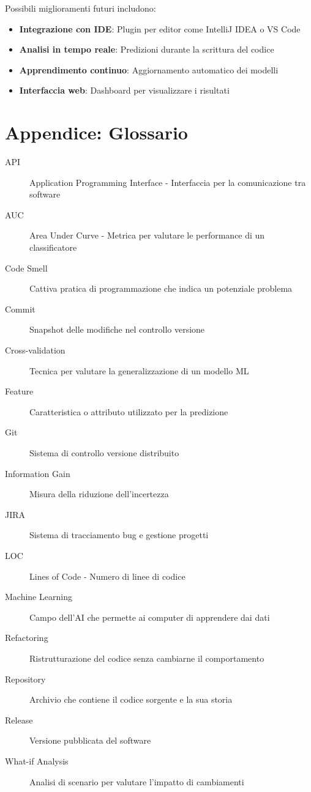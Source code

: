 \documentclass[12pt,a4paper]{article}
\begin{document}
Possibili miglioramenti futuri includono:
\begin{itemize}
    \item \textbf{Integrazione con IDE}: Plugin per editor come IntelliJ IDEA o VS Code
    \item \textbf{Analisi in tempo reale}: Predizioni durante la scrittura del codice
    \item \textbf{Apprendimento continuo}: Aggiornamento automatico dei modelli
    \item \textbf{Interfaccia web}: Dashboard per visualizzare i risultati
\end{itemize}

\section{Appendice: Glossario}

\begin{description}
    \item[API] Application Programming Interface - Interfaccia per la comunicazione tra software
    \item[AUC] Area Under Curve - Metrica per valutare le performance di un classificatore
    \item[Code Smell] Cattiva pratica di programmazione che indica un potenziale problema
    \item[Commit] Snapshot delle modifiche nel controllo versione
    \item[Cross-validation] Tecnica per valutare la generalizzazione di un modello ML
    \item[Feature] Caratteristica o attributo utilizzato per la predizione
    \item[Git] Sistema di controllo versione distribuito
    \item[Information Gain] Misura della riduzione dell'incertezza
    \item[JIRA] Sistema di tracciamento bug e gestione progetti
    \item[LOC] Lines of Code - Numero di linee di codice
    \item[Machine Learning] Campo dell'AI che permette ai computer di apprendere dai dati
    \item[Refactoring] Ristrutturazione del codice senza cambiarne il comportamento
    \item[Repository] Archivio che contiene il codice sorgente e la sua storia
    \item[Release] Versione pubblicata del software
    \item[What-if Analysis] Analisi di scenario per valutare l'impatto di cambiamenti
\end{description}
\end{document}
